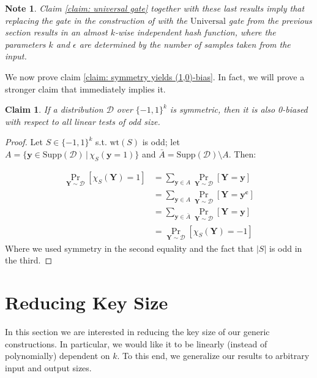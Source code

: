 \documentclass[12pt]{article}
\newtheorem{claim}[theorem]{Claim}
\newtheorem{note}[theorem]{Note}
\newcommand{\Supp}[1]{\mathrm{Supp}\left(#1\right)}
\newcommand{\oo}[1]{\{-1,1\}^{#1}}
\newcommand{\dist}{\mathcal{D}}
\newcommand{\abs}[1]{\left| #1 \right|}
\renewcommand{\vec}[1]{\bm{#1}}
\newcommand{\wt}[1]{\mathrm{wt}\left(#1\right)}
\begin{document}
	\begin{note}
		Claim \ref{claim: universal gate} together with these last results imply that replacing the gate in the construction of \cite{Valiant} with the $\mathrm{Universal}$ gate from the previous section results in an almost $k$-wise independent hash function, where the parameters $k$ and $\epsilon$ are determined by the number of samples taken from the input.
	\end{note}
	
	We now prove claim \ref{claim: symmetry yields (1,0)-bias}.
	In fact, we will prove a stronger claim that immediately implies it.
	
	\begin{claim} \label{claim: odd bias}
		If a distribution $\dist$ over $\oo{k}$ is symmetric, then it is also 0-biased with respect to all linear tests of odd size.
	\end{claim}
	
	\begin{proof}
		Let $S \in \oo{k}$ s.t. $\wt{S}$ is odd; let $A = \{\vec{y} \in \Supp{\dist} \, \vert \, \chi_S(\vec{y} = 1) \}$ and $\bar{A} = \Supp{\dist} \setminus A$. Then:
		
		\begin{align*}
		\Pr_{\vec{Y} \sim \dist} \left[ \chi_S(\vec{Y}) = 1 \right]
		&= \sum_{\vec{y} \in A} \Pr_{\vec{Y} \sim \dist} \left[ \vec{Y} = \vec{y} \right]\\
		&= \sum_{\vec{y} \in A} \Pr_{\vec{Y} \sim \dist} \left[ \vec{Y} = \vec{y^c} \right]\\
		&= \sum_{\vec{y} \in \bar{A}} \Pr_{\vec{Y} \sim \dist} \left[ \vec{Y} = \vec{y} \right]\\
		&= \Pr_{\vec{Y} \sim \dist} \left[ \chi_S(\vec{Y}) = -1 \right]
		\end{align*}
		Where we used symmetry in the second equality and the fact that $\abs{S}$ is odd in the third.
		
	\end{proof}

\section{Reducing Key Size} \label{section: reducing randomness}
	
	In this section we are interested in reducing the key size of our generic constructions.
	In particular, we would like it to be linearly (instead of polynomially) dependent on $k$.
	To this end, we generalize our results to arbitrary input and output sizes.
	
\end{document}
